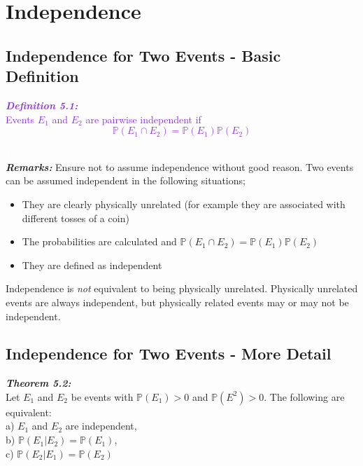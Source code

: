 \documentclass{report}
\newenvironment{cframed}[1][BlueViolet]
  {\begin{tcolorbox}[colframe=#1,colback=white]}
  {\end{tcolorbox}}
\newenvironment{cframed2}[1][PineGreen]
  {\begin{tcolorbox}[colframe=#1,colback=white]}
  {\end{tcolorbox}}
\begin{document}
\chapter{Independence}
\section{Independence for Two Events - Basic Definition}

\begin{cframed}
\textcolor{BlueViolet}{\textit{\textbf{Definition 5.1:}}}\\
\textcolor{BlueViolet}{Events $E_1$ and $E_2$ are pairwise independent if}\\
\textcolor{BlueViolet}{\begin{equation}
    \mathbb{P}(E_1 \cap E_2) = \mathbb{P}{(E_1)\mathbb{P}(E_2)}
\end{equation}}
\end{cframed}
\textcolor{White}{123}\\
\textit{\textbf{Remarks:}}
Ensure not to assume independence without good reason. Two events can be assumed independent in the following situations;
\begin{itemize}
    \item They are clearly physically unrelated (for example they are associated with different tosses of a coin)
    \item The probabilities are calculated and $\mathbb{P}(E_1 \cap E_2) = \mathbb{P}(E_1)\mathbb{P}(E_2)$
    \item They are defined as independent
\end{itemize}
Independence is \textit{not} equivalent to being physically unrelated. Physically unrelated events are always independent, but physically related events may or may not be independent.
\pagebreak
\section{Independence for Two Events - More Detail}

\begin{cframed2}
\textcolor{PineGreen}{\textit{\textbf{Theorem 5.2:}}}\\
\textcolor{PineGreen}{Let $E_1$ and $E_2$ be events with $\mathbb{P}(E_1) > 0$ and $\mathbb{P}(E^2) > 0$. The following are equivalent:}\\
\textcolor{PineGreen}{a) $E_1$ and $E_2$ are independent,}\\
\textcolor{PineGreen}{b) $\mathbb{P}(E_1|E_2) = \mathbb{P}(E_1)$,}\\
\textcolor{PineGreen}{c) $\mathbb{P}(E_2|E_1) = \mathbb{P}(E_2)$}
\end{cframed2}
\end{document}
